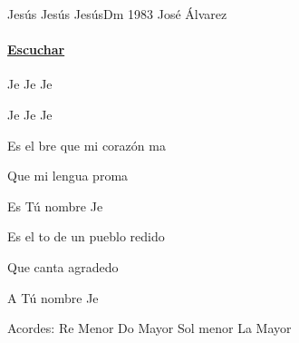 \documentclass[12pt, spanish]{book}
\begin{document}
    \begin{song}{Jesús Jesús Jesús}{Dm}
    {1983} %
    {José Álvarez}
    {} %
    {}
        \ifChordBk
        \paragraph{\mbox{}\hfill\protect\href{https://open.spotify.com/intl-es/track/4gNFlUWxPkWxMrVLi2cuRO}{Escuchar}\mbox{}\hfill}
        \fi

        \begin{SBOpGroup}
            Je Je Je

            Je Je Je
        \end{SBOpGroup}

        \begin{SBChorus}
            Es el bre que mi corazón ma

            Que mi lengua proma

            Es Tú nombre Je

            Es el to de un pueblo redido

            Que canta agradedo

            A Tú nombre Je
        \end{SBChorus}

        \ifChordBk
        \begin{SBOpGroup}
            Acordes:\break
            \upchord{\Dm}\qquad Re Menor \hfill
            \upchord{\C}\qquad Do Mayor \hfill\null\break
            \upchord{\Gm}Sol menor \hfill
            \upchord{\A}\qquad La Mayor \hfill\null\break
        \end{SBOpGroup}
        \fi
    \end{song}
\end{document}
